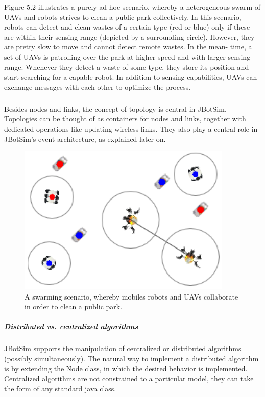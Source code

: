 Figure 5.2 illustrates a purely ad hoc scenario, whereby a heterogeneous swarm of UAVs and robots strives to clean a public park collectively. In this scenario, robots can detect and clean wastes of a certain type (red or blue) only if these are within their sensing range (depicted by a surrounding circle). However, they are pretty slow to move and cannot detect remote wastes. In the mean- time, a set of UAVs is patrolling over the park at higher speed and with larger sensing range. Whenever they detect a waste of some type, they store its position and start searching for a capable robot. In addition to sensing capabilities, UAVs can exchange messages with each other to optimize the process.
\subparagraph{}Besides nodes and links, the concept of topology is central in  JBotSim. Topologies can be thought of as containers for nodes and links, together with dedicated operations like updating wireless links. They also play a central role in  JBotSim's event architecture, as explained later on.
\begin{figure}[h!]
	\centering
	\includegraphics[width=0.5\linewidth]{fig_3}
	\caption[A swarming scenario, whereby mobiles robots and UAVs collaborate in order to clean a public park.]{A swarming scenario, whereby mobiles robots and UAVs collaborate in order to clean a public park.}
	\label{fig:fig3}
\end{figure}
\newpage
\subparagraph{Distributed vs. centralized algorithms}
\subparagraph{} JBotSim  supports the manipulation of centralized or distributed algorithms (possibly simultaneously). The natural way to implement a distributed algorithm is by extending the Node class, in which the desired behavior is implemented. Centralized algorithms are not constrained to a particular model, they can take the form of any standard java class.

